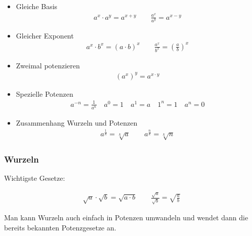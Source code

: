 \documentclass[a4paper]{article}
\begin{document}
\begin{itemize}
	\item Gleiche Basis\\
	\begin{align*}
		a^x \cdot a^y = a^{x+y} \qquad \frac{a^x}{a^y} = a^{x-y}
	\end{align*}

	
	\item Gleicher Exponent\\
	
	\begin{align*}
		a^x \cdot b^x = (a \cdot b)^x \qquad \frac{a^x}{b^x} = \left( \frac{a}{b}\right)^x
	\end{align*}
	
	\item Zweimal potenzieren\\
	
	\begin{align*}
		(a^x)^y = a^{x \cdot y}
	\end{align*}
	
	\item Spezielle Potenzen\\
	
	\begin{align*}
		a^{-n} = \frac{1}{a^n} \quad a^0 = 1 \quad a^1 = a \quad 1^n = 1 \quad a^n = 0
	\end{align*}
	
	\item Zusammenhang Wurzeln und Potenzen\\
	
	\begin{align*}
		a^\frac{1}{k} = \sqrt[k]{a} \qquad a^\frac{n}{k} = \sqrt[k]{n}
	\end{align*}
	
	
\end{itemize}


\subsubsection*{Wurzeln}

Wichtigste Gesetze:

\begin{align*}
	\sqrt{a} \cdot \sqrt{b} = \sqrt{a \cdot b} \qquad \frac{\sqrt{a}}{\sqrt{b}} = \sqrt{\frac{a}{b}}
\end{align*}

Man kann Wurzeln auch einfach in Potenzen umwandeln und wendet dann die bereits bekannten Potenzgesetze an.
\end{document}

